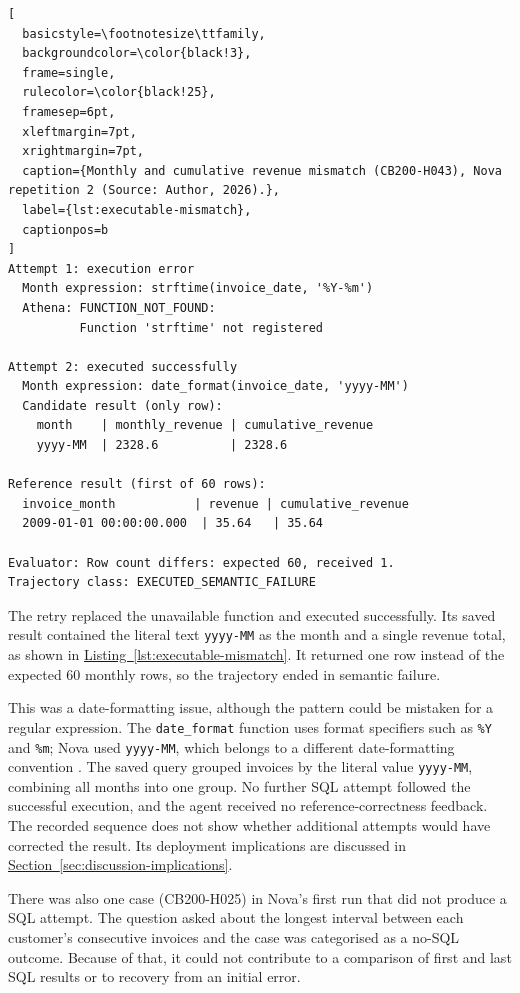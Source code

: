 \noindent\begin{minipage}{\linewidth}
\begin{lstlisting}[
  basicstyle=\footnotesize\ttfamily,
  backgroundcolor=\color{black!3},
  frame=single,
  rulecolor=\color{black!25},
  framesep=6pt,
  xleftmargin=7pt,
  xrightmargin=7pt,
  caption={Monthly and cumulative revenue mismatch (CB200-H043), Nova repetition 2 (Source: Author, 2026).},
  label={lst:executable-mismatch},
  captionpos=b
]
Attempt 1: execution error
  Month expression: strftime(invoice_date, '%Y-%m')
  Athena: FUNCTION_NOT_FOUND:
          Function 'strftime' not registered

Attempt 2: executed successfully
  Month expression: date_format(invoice_date, 'yyyy-MM')
  Candidate result (only row):
    month    | monthly_revenue | cumulative_revenue
    yyyy-MM  | 2328.6          | 2328.6

Reference result (first of 60 rows):
  invoice_month           | revenue | cumulative_revenue
  2009-01-01 00:00:00.000  | 35.64   | 35.64

Evaluator: Row count differs: expected 60, received 1.
Trajectory class: EXECUTED_SEMANTIC_FAILURE
\end{lstlisting}
\end{minipage}

The retry replaced the unavailable function and executed successfully.
Its saved result contained the literal text \texttt{yyyy-MM} as the month
and a single revenue total, as shown in
\hyperref[lst:executable-mismatch]{Listing~\ref*{lst:executable-mismatch}}.
It returned one row instead of the expected 60 monthly rows, so the
trajectory ended in semantic failure.

This was a date-formatting issue, 
although the pattern could be mistaken for a regular expression.
The \texttt{date\_format} function uses format specifiers such as
\texttt{\%Y} and \texttt{\%m}; Nova used \texttt{yyyy-MM},
which belongs to a different date-formatting convention
\citep{trinoDateTimeFunctions}.
The saved query grouped invoices by the literal value \texttt{yyyy-MM},
combining all months into one group.
No further SQL attempt followed the successful execution, and the agent
received no reference-correctness feedback.
The recorded sequence does not show whether additional attempts would have
corrected the result. Its deployment implications are discussed in
\hyperref[sec:discussion-implications]{Section~\ref*{sec:discussion-implications}}.

There was also one case (CB200-H025) in Nova's first run that did not produce a SQL attempt.
The question asked about the longest interval between each customer's consecutive invoices and
the case was categorised as a no-SQL outcome.
Because of that, it could not contribute to a
comparison of first and last SQL results or to recovery from an initial error.

